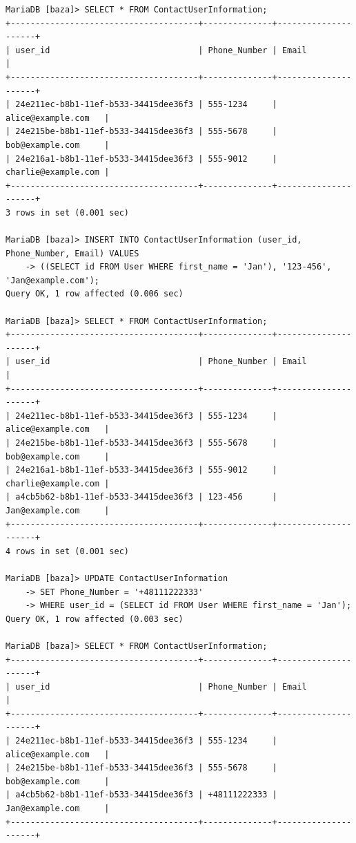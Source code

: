 \documentclass{article}
\begin{document}
\begin{verbatim}
MariaDB [baza]> SELECT * FROM ContactUserInformation;
+--------------------------------------+--------------+---------------------+
| user_id                              | Phone_Number | Email               |
+--------------------------------------+--------------+---------------------+
| 24e211ec-b8b1-11ef-b533-34415dee36f3 | 555-1234     | alice@example.com   |
| 24e215be-b8b1-11ef-b533-34415dee36f3 | 555-5678     | bob@example.com     |
| 24e216a1-b8b1-11ef-b533-34415dee36f3 | 555-9012     | charlie@example.com |
+--------------------------------------+--------------+---------------------+
3 rows in set (0.001 sec)

MariaDB [baza]> INSERT INTO ContactUserInformation (user_id, Phone_Number, Email) VALUES
    -> ((SELECT id FROM User WHERE first_name = 'Jan'), '123-456', 'Jan@example.com');
Query OK, 1 row affected (0.006 sec)

MariaDB [baza]> SELECT * FROM ContactUserInformation;
+--------------------------------------+--------------+---------------------+
| user_id                              | Phone_Number | Email               |
+--------------------------------------+--------------+---------------------+
| 24e211ec-b8b1-11ef-b533-34415dee36f3 | 555-1234     | alice@example.com   |
| 24e215be-b8b1-11ef-b533-34415dee36f3 | 555-5678     | bob@example.com     |
| 24e216a1-b8b1-11ef-b533-34415dee36f3 | 555-9012     | charlie@example.com |
| a4cb5b62-b8b1-11ef-b533-34415dee36f3 | 123-456      | Jan@example.com     |
+--------------------------------------+--------------+---------------------+
4 rows in set (0.001 sec)

MariaDB [baza]> UPDATE ContactUserInformation
    -> SET Phone_Number = '+48111222333'
    -> WHERE user_id = (SELECT id FROM User WHERE first_name = 'Jan');
Query OK, 1 row affected (0.003 sec)

MariaDB [baza]> SELECT * FROM ContactUserInformation;
+--------------------------------------+--------------+---------------------+
| user_id                              | Phone_Number | Email               |
+--------------------------------------+--------------+---------------------+
| 24e211ec-b8b1-11ef-b533-34415dee36f3 | 555-1234     | alice@example.com   |
| 24e215be-b8b1-11ef-b533-34415dee36f3 | 555-5678     | bob@example.com     |
| a4cb5b62-b8b1-11ef-b533-34415dee36f3 | +48111222333 | Jan@example.com     |
+--------------------------------------+--------------+---------------------+

\end{verbatim}
\end{document}
